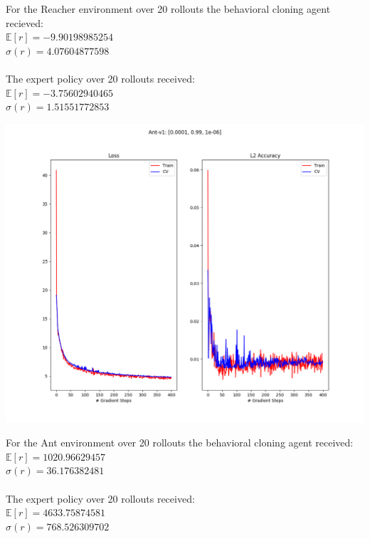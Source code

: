 \documentclass[12pt]{report}
\begin{document}
For the Reacher environment over 20 rollouts the behavioral cloning agent recieved:\\
$\mathbb{E}[r]=-9.90198985254$\\
$\sigma(r) =  4.07604877598$\\
\\
The expert policy over 20 rollouts received:\\
$\mathbb{E}[r]=-3.75602940465$\\
$\sigma(r) =  1.51551772853$\\
\newpage
\begin{center}
\includegraphics[scale=.6]{./images/ant_train_summary.png}
\end{center}
For the Ant environment over 20 rollouts the behavioral cloning agent received:\\
$\mathbb{E}[r]=1020.96629457$\\
$\sigma(r) =   36.176382481$\\
\\
The expert policy over 20 rollouts received:\\
$\mathbb{E}[r]=4633.75874581$\\
$\sigma(r) =   768.526309702$\\
\end{document}
